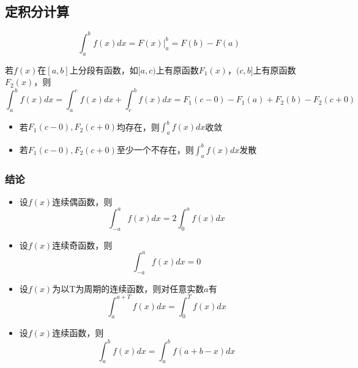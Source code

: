 \subsection{定积分计算}
\[\int_a^bf(x)dx = F(x)\bigg|_a^b = F(b) - F(a)\]

若\(f(x)\)在\([a, b]\)上分段有函数，如\([a, c)\)上有原函数\(F_1(x)\)，\((c, b]\)上有原函数\(F_2(x)\)，则\[\int_a^bf(x)dx = \int_a^cf(x)dx + \int_c^bf(x)dx = F_1(c - 0) - F_1(a) + F_2(b) - F_2(c + 0)\]
\begin{itemize}
    \item 若\(F_1(c - 0), F_2(c + 0)\)均存在，则\(\displaystyle\int_a^bf(x)dx\)收敛
    \item 若\(F_1(c - 0), F_2(c + 0)\)至少一个不存在，则\(\displaystyle\int_a^bf(x)dx\)发散
\end{itemize}

\subsubsection{结论}
\begin{itemize}
    \item 设\(f(x)\)连续偶函数，则\[\int_{-a}^af(x)dx = 2\int_0^af(x)dx\]
    \item 设\(f(x)\)连续奇函数，则\[\int_{-a}^af(x)dx = 0\]
    \item 设\(f(x)\)为以T为周期的连续函数，则对任意实数\(a\)有\[\int_a^{a + T}f(x)dx = \int_0^Tf(x)dx\]
    \item 设\(f(x)\)连续函数，则\[\int_a^bf(x)dx = \int_a^bf(a + b - x)dx\]
\end{itemize}


